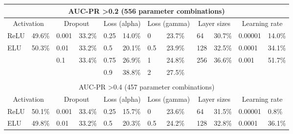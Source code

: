 \documentclass[ppgc, diss, english]{iiufrgs}
\begin{document}
\begin{table}[!th]
\begin{adjustbox}{scale=0.9,center}
\begin{tabular}{llllllllllll}
\hline
\multicolumn{12}{c}{AUC-PR \textgreater 0.2 (556 parameter combinations)}                                                                                                                                \\ \hline
\multicolumn{2}{c}{Activation} & \multicolumn{2}{c}{Dropout} & \multicolumn{2}{c}{Loss (alpha)} & \multicolumn{2}{c}{Loss (gamma)} & \multicolumn{2}{c}{Layer sizes} & \multicolumn{2}{c}{Learning rate} \\
ReLU          & 49.6\%         & 0.001        & 33.2\%       & 0.25           & 14.0\%          & 0             & 23.7\%           & 64            & 30.7\%          & 0.00001          & 14.0\%         \\
ELU           & 50.3\%         & 0.01         & 33.2\%       & 0.5            & 20.1\%          & 0.5           & 23.9\%           & 128           & 32.5\%          & 0.0001           & 34.1\%         \\
              &                & 0.1          & 33.4\%       & 0.75           & 26.9\%          & 1             & 24.8\%           & 256           & 36.6\%          & 0.001            & 51.7\%         \\
              &                &              &              & 0.9            & 38.8\%          & 2             & 27.5\%           &               &                 &                  &                \\
              &                &              &              &                &                 &               &                  &               &                 &                  &                \\ \hline
\multicolumn{12}{c}{AUC-PR \textgreater 0.4 (457 parameter combinations)}                                                                                                                                \\ \hline
\multicolumn{2}{c}{Activation} & \multicolumn{2}{c}{Dropout} & \multicolumn{2}{c}{Loss (alpha)} & \multicolumn{2}{c}{Loss (gamma)} & \multicolumn{2}{c}{Layer sizes} & \multicolumn{2}{c}{Learning rate} \\
ReLU          & 50.1\%         & 0.001        & 33.4\%       & 0.25           & 15.7\%          & 0             & 23.6\%           & 64            & 31.5\%          & 0.00001          & 0.8\%          \\
ELU           & 49.8\%         & 0.01         & 33.2\%       & 0.5            & 20.3\%          & 0.5           & 24.2\%           & 128           & 32.8\%          & 0.0001           & 36.1\%         \\

\end{tabular}
\end{adjustbox}
\end{table}
\end{document}
